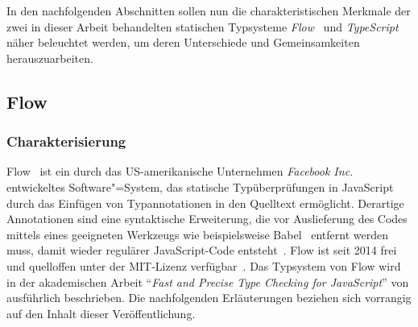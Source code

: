 

In den nachfolgenden Abschnitten sollen nun die charakteristischen Merkmale der zwei in dieser Arbeit behandelten statischen Typsysteme \textit{Flow}~\autocite{FLOW:PAPER} und \textit{TypeScript}~\autocite{TYPESCRIPT:SPEC} näher beleuchtet werden, um deren Unterschiede und Gemeinsamkeiten herauszuarbeiten.

\subsection{Flow}
\label{sec:flow}

\subsubsection{Charakterisierung}

Flow~\autocite{FLOW:PAPER} ist ein durch das US-amerikanische Unternehmen \textit{Facebook Inc.} entwickeltes Software"=System, das statische Typüberprüfungen in JavaScript durch das Einfügen von Typannotationen in den Quelltext ermöglicht. Derartige Annotationen sind eine syntaktische Erweiterung, die vor Auslieferung des Codes mittels eines geeigneten Werkzeugs wie beispielsweise Babel~\autocite{BABEL} entfernt werden muss, damit wieder regulärer JavaScript-Code entsteht~\autocite{FLOW:INSTALLATION}. Flow ist seit 2014 frei und quelloffen unter der MIT-Lizenz verfügbar~\autocites{LICENSE:MIT,FLOW:GITHUB}. Das Typsystem von Flow wird in der akademischen Arbeit \enquote{\textit{Fast and Precise Type Checking for JavaScript}} von \citeauthor{FLOW:PAPER} ausführlich beschrieben. Die nachfolgenden Erläuterungen beziehen sich vorrangig auf den Inhalt dieser Veröffentlichung.

